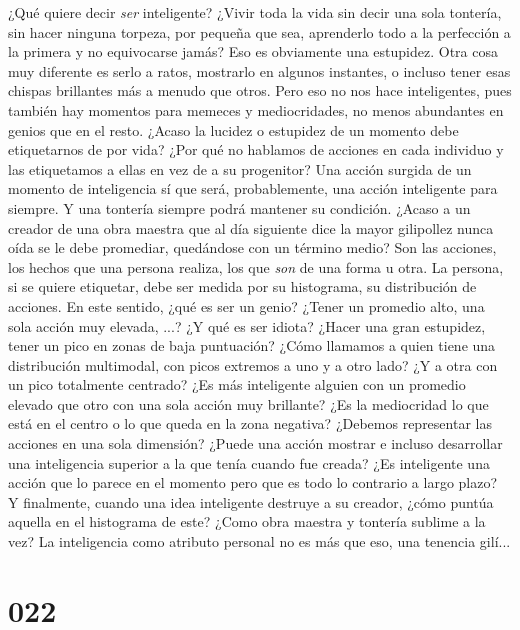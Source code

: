 \documentclass[a4paper,11pt,openright,twocolumn]{book}
\begin{document}
¿Qué quiere decir {\it ser}   inteligente? ¿Vivir toda la vida sin decir una sola tontería, sin hacer ninguna torpeza, por pequeña que sea, aprenderlo todo a la perfección a la primera y no equivocarse jamás? Eso es obviamente una estupidez. Otra cosa muy diferente es serlo a ratos, mostrarlo en algunos instantes, o incluso tener esas chispas brillantes más a menudo que otros. Pero eso no nos hace inteligentes, pues también hay momentos para memeces y mediocridades, no menos abundantes en genios que en el resto. ¿Acaso la lucidez o estupidez de un momento debe etiquetarnos de por vida? ¿Por qué no hablamos de acciones en cada individuo y las etiquetamos a ellas en vez de a su progenitor? Una acción surgida de un momento de inteligencia sí que será, probablemente, una acción inteligente para siempre. Y una tontería siempre podrá mantener su condición. ¿Acaso a un creador de una obra maestra que al día siguiente dice la mayor gilipollez nunca oída se le debe promediar, quedándose con un término medio? Son las acciones, los hechos que una persona realiza, los que {\it son}   de una forma u otra. La persona, si se quiere etiquetar, debe ser medida por su histograma, su distribución de acciones. En este sentido, ¿qué es ser un genio? ¿Tener un promedio alto, una sola acción muy elevada, ...? ¿Y qué es ser idiota? ¿Hacer una gran estupidez, tener un pico en zonas de baja puntuación? ¿Cómo llamamos a quien tiene una distribución multimodal, con picos extremos a uno y a otro lado? ¿Y a otra con un pico totalmente centrado? ¿Es más inteligente alguien con un promedio elevado que otro con una sola acción muy brillante? ¿Es la mediocridad lo que está en el centro o lo que queda en la zona negativa? ¿Debemos representar las acciones en una sola dimensión? ¿Puede una acción mostrar e incluso desarrollar una inteligencia superior a la que tenía cuando fue creada? ¿Es inteligente una acción que lo parece en el momento pero que es todo lo contrario a largo plazo? Y finalmente, cuando una idea inteligente destruye a su creador, ¿cómo puntúa aquella en el histograma de este? ¿Como obra maestra y tontería sublime a la vez? La inteligencia como atributo personal no es más que eso, una tenencia gilí...

\section*{022}
\end{document}
